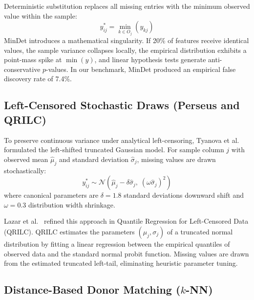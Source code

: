 \documentclass[11pt,oneside]{book}
\begin{document}
Deterministic substitution replaces all missing entries with the minimum observed value within the sample:
\begin{equation}
y_{ij}^* = \min_{k \in O_j}(y_{kj})
\end{equation}
MinDet introduces a mathematical singularity. If 20\% of features receive identical values, the sample variance collapses locally, the empirical distribution exhibits a point-mass spike at $\min(y)$, and linear hypothesis tests generate anti-conservative $p$-values. In our benchmark, MinDet produced an empirical false discovery rate of 7.4\%.

\subsection{Left-Censored Stochastic Draws (Perseus and QRILC)}

To preserve continuous variance under analytical left-censoring, Tyanova et al.~\cite{tyanova2016perseus} formulated the left-shifted truncated Gaussian model. For sample column $j$ with observed mean $\hat{\mu}_j$ and standard deviation $\hat{\sigma}_j$, missing values are drawn stochastically:
\begin{equation}
\label{eq:perseus_impute}
y_{ij}^* \sim \mathcal{N}\left( \hat{\mu}_j - \delta \hat{\sigma}_j, \; (\omega \hat{\sigma}_j)^2 \right)
\end{equation}
where canonical parameters are $\delta = 1.8$ standard deviations downward shift and $\omega = 0.3$ distribution width shrinkage.

Lazar et al.~\cite{lazar2016accounting} refined this approach in Quantile Regression for Left-Censored Data (QRILC). QRILC estimates the parameters $(\mu_j, \sigma_j)$ of a truncated normal distribution by fitting a linear regression between the empirical quantiles of observed data and the standard normal probit function. Missing values are drawn from the estimated truncated left-tail, eliminating heuristic parameter tuning.

\subsection{Distance-Based Donor Matching (\texorpdfstring{$k$-NN}{k-NN})}
\end{document}
